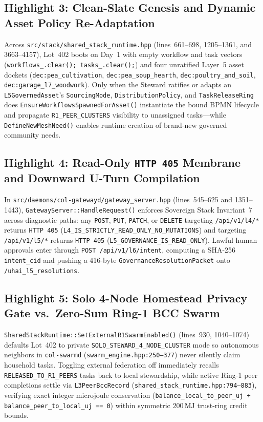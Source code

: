 \subsection{Highlight 3: Clean-Slate Genesis and Dynamic Asset Policy Re-Adaptation}

Across \texttt{src/stack/shared\_stack\_runtime.hpp} (lines~661--698, 1205--1361, and
3663--4157), Lot~402 boots on Day~1 with empty workflow and task vectors
(\texttt{workflows\_.clear(); tasks\_.clear();}) and four unratified Layer~5 asset dockets
(\texttt{dec:pea\_cultivation}, \texttt{dec:pea\_soup\_hearth}, \texttt{dec:poultry\_and\_soil},
\texttt{dec:garage\_l7\_woodwork}). Only when the Steward ratifies or adapts an
\texttt{L5GovernedAsset}'s \texttt{SourcingMode}, \texttt{DistributionPolicy}, and
\texttt{TaskReleaseRing} does \texttt{EnsureWorkflowsSpawnedForAsset()} instantiate the bound
BPMN lifecycle and propagate \texttt{R1\_PEER\_CLUSTERS} visibility to unassigned tasks---while
\texttt{DefineNewMeshNeed()} enables runtime creation of brand-new governed community needs.

\subsection{Highlight 4: Read-Only \texttt{HTTP 405} Membrane and Downward U-Turn Compilation}

In \texttt{src/daemons/col-gatewayd/gateway\_server.hpp} (lines~545--625 and 1351--1443),
\texttt{GatewayServer::HandleRequest()} enforces Sovereign Stack Invariant~7 across diagnostic
paths: any \texttt{POST}, \texttt{PUT}, \texttt{PATCH}, or \texttt{DELETE} targeting
\texttt{/api/v1/l4/*} returns \texttt{HTTP 405} (\texttt{L4\_IS\_STRICTLY\_READ\_ONLY\_NO\_MUTATIONS})
and targeting \texttt{/api/v1/l5/*} returns \texttt{HTTP 405} (\texttt{L5\_GOVERNANCE\_IS\_READ\_ONLY}).
Lawful human approvals enter through \texttt{POST /api/v1/l6/intent}, computing a SHA-256
\texttt{intent\_cid} and pushing a 416-byte \texttt{GovernanceResolutionPacket} onto
\texttt{/uhai\_l5\_resolutions}.

\subsection{Highlight 5: Solo 4-Node Homestead Privacy Gate vs.\ Zero-Sum Ring-1 BCC Swarm}

\texttt{SharedStackRuntime::SetExternalR1SwarmEnabled()} (lines~930, 1040--1074) defaults Lot~402
to private \texttt{SOLO\_STEWARD\_4\_NODE\_CLUSTER} mode so autonomous neighbors in
\texttt{col-swarmd} (\texttt{swarm\_engine.hpp:250--377}) never silently claim household tasks.
Toggling external federation off immediately recalls \texttt{RELEASED\_TO\_R1\_PEERS} tasks back
to local stewardship, while active Ring-1 peer completions settle via \texttt{L3PeerBccRecord}
(\texttt{shared\_stack\_runtime.hpp:794--883}), verifying exact integer microjoule conservation
(\texttt{balance\_local\_to\_peer\_uj + balance\_peer\_to\_local\_uj == 0}) within symmetric
$200\,\mathrm{MJ}$ trust-ring credit bounds.

